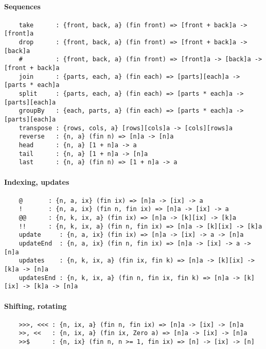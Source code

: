 \paragraph*{Sequences}
\begin{Verbatim}
    take      : {front, back, a} (fin front) => [front + back]a -> [front]a
    drop      : {front, back, a} (fin front) => [front + back]a -> [back]a
    #         : {front, back, a} (fin front) => [front]a -> [back]a -> [front + back]a
    join      : {parts, each, a} (fin each) => [parts][each]a -> [parts * each]a
    split     : {parts, each, a} (fin each) => [parts * each]a -> [parts][each]a
    groupBy   : {each, parts, a} (fin each) => [parts * each]a -> [parts][each]a
    transpose : {rows, cols, a} [rows][cols]a -> [cols][rows]a
    reverse   : {n, a} (fin n) => [n]a -> [n]a
    head      : {n, a} [1 + n]a -> a
    tail      : {n, a} [1 + n]a -> [n]a
    last      : {n, a} (fin n) => [1 + n]a -> a
\end{Verbatim}
\paragraph*{Indexing, updates}
\begin{Verbatim}
    @       : {n, a, ix} (fin ix) => [n]a -> [ix] -> a
    !       : {n, a, ix} (fin n, fin ix) => [n]a -> [ix] -> a
    @@      : {n, k, ix, a} (fin ix) => [n]a -> [k][ix] -> [k]a
    !!      : {n, k, ix, a} (fin n, fin ix) => [n]a -> [k][ix] -> [k]a
    update     : {n, a, ix} (fin ix) => [n]a -> [ix] -> a -> [n]a
    updateEnd  : {n, a, ix} (fin n, fin ix) => [n]a -> [ix] -> a -> [n]a
    updates    : {n, k, ix, a} (fin ix, fin k) => [n]a -> [k][ix] -> [k]a -> [n]a
    updatesEnd : {n, k, ix, a} (fin n, fin ix, fin k) => [n]a -> [k][ix] -> [k]a -> [n]a
\end{Verbatim}
\paragraph*{Shifting, rotating}
\begin{Verbatim}
    >>>, <<< : {n, ix, a} (fin n, fin ix) => [n]a -> [ix] -> [n]a
    >>, <<   : {n, ix, a} (fin ix, Zero a) => [n]a -> [ix] -> [n]a
    >>$      : {n, ix} (fin n, n >= 1, fin ix) => [n] -> [ix] -> [n]
\end{Verbatim}
